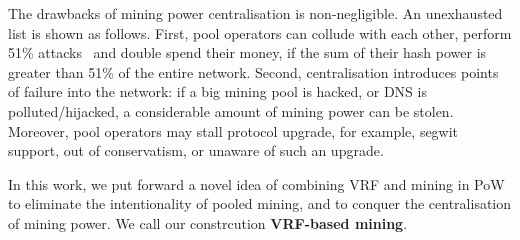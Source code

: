 The drawbacks of mining power centralisation is non-negligible.
An unexhausted list is shown as follows.
First, pool operators can collude with each other, perform 51\% attacks~\cite{} and double spend their money, if the sum of their hash power is greater than 51\% of the entire network.
Second, centralisation introduces points of failure into the network: if a big mining pool is hacked, or DNS is polluted/hijacked, a considerable amount of mining power can be stolen.
Moreover, pool operators may stall protocol upgrade, for example, segwit support, out of conservatism, or unaware of such an upgrade.

In this work, we put forward a novel idea of combining VRF and mining in PoW to eliminate the intentionality of pooled mining, and to conquer the centralisation of mining power. We call our constrcution \textbf{VRF-based mining}.